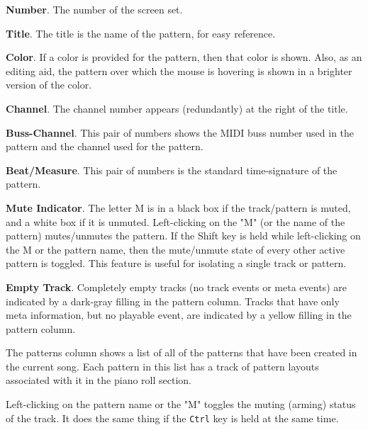    \begin{enumber}
      \item \textbf{Number}.
         The number of the screen set.
      \item \textbf{Title}.
         The title is the name of the pattern, for easy reference.
      \item \textbf{Color}.
         If a color is provided for the pattern, then that color is shown.
         Also, as an editing aid, the pattern over which the mouse is hovering
         is shown in a brighter version of the color.
      \item \textbf{Channel}.
         The channel number appears (redundantly)
         at the right of the title.
      \item \textbf{Buss-Channel}.
         This pair of numbers shows the MIDI buss number used in the pattern
         and the channel used for the pattern.
      \item \textbf{Beat/Measure}.
         This pair of numbers is the standard time-signature of the pattern.
      \item \textbf{Mute Indicator}.
         The letter M is in a black box if the track/pattern is muted, and a
         white box if it is unmuted.
         Left-clicking on the "M" (or the name of the pattern)
         mutes/unmutes the pattern.
         If the Shift key is held while left-clicking on the M or the pattern
         name, then
         the mute/unmute state of every other active pattern is toggled.
         This feature is useful for isolating a single track or pattern.
      \item \textbf{Empty Track}.
         Completely empty tracks (no track events or meta events)
         are indicated by a dark-gray filling in the pattern column.
         Tracks that have only meta information, but no playable event, are
         indicated by a yellow filling in the pattern column.
   \end{enumber}

   The patterns column shows a list of all of the patterns that have been
   created in the current song.  Each pattern in this list has a track of
   pattern layouts associated with it in the piano roll section.

   Left-clicking on the pattern name or the "M" toggles the muting
   (arming) status of the track.
   It does the same thing if the \texttt{Ctrl} key is held at the same time.

